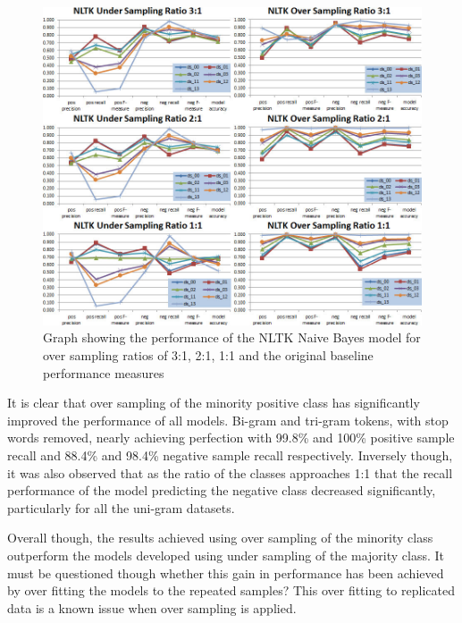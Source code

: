 \begin{figure}[htbp]
	\centering
	\includegraphics[width=1\textwidth]{Figures/Chapter5/nltk_process_chart_04.jpg}
	\caption[NLTK model performance using over sampling]{Graph showing the performance of the NLTK Naive Bayes model for over sampling ratios of 3:1, 2:1, 1:1 and the original baseline performance measures}
	\label{fig:nltk_process_chart_04}
\end{figure}

It is clear that over sampling of the minority positive class has significantly improved the performance of all models. Bi-gram and tri-gram tokens, with stop words removed, nearly achieving perfection with 99.8\% and 100\% positive sample recall and 88.4\% and 98.4\% negative sample recall respectively. Inversely though, it was also observed that as the ratio of the classes approaches 1:1 that the recall performance of the model predicting the negative class decreased significantly, particularly for all the uni-gram datasets.

Overall though, the results achieved using over sampling of the minority class outperform the models developed using under sampling of the majority class. It must be questioned though whether this gain in performance has been achieved by over fitting the models to the repeated samples? This over fitting to replicated data is a known issue when over sampling is applied.

